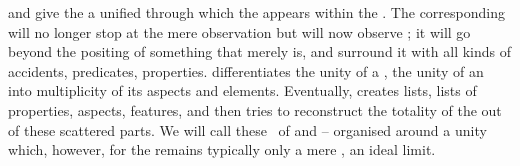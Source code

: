 \label{pa:rssA}
%
 and  give the  a unified 
through which the  appears within the \hoa.  The corresponding
 will no longer stop at the mere observation  but will now
observe ; it will go beyond the  positing
of something that merely is, and surround it with all kinds of accidents,
predicates, properties.  differentiates the unity
of a , the unity of an  into multiplicity of its
aspects and elements.  Eventually,  creates lists, lists of
properties, aspects, features, and then tries to reconstruct the totality of the
 out of these scattered parts. We will call these \rss\ of
  and  --  organised
around a unity which, however, for the  remains
typically only a mere , an ideal limit.

